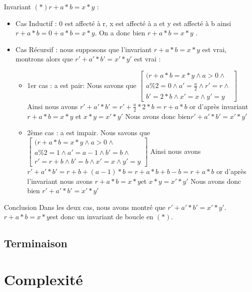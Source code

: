 \documentclass[12pt,a4paper]{report}
\begin{document}
\begin{flushleft}
Invariant $(*) r+a*b = x*y$ :\\
\begin{itemize}
\item Cas Inductif : 0   est affecté à r, x  est affecté à a  et y   est affecté à b  ainsi $ r +a*b = 0 + a*b = x*y $. On a donc bien $ r + a*b = x*y$ .
\item Cas Récursif : nous supposons que l’invariant  $ r + a*b = x*y$ est vrai, montrons alors que  $ r' + a'*b' = x'*y'$ est vrai :
\begin{itemize}
\item 1er cas : a est pair:  Nous savons que $\left[ \begin{array}{c}(r + a*b = x*y\wedge a>0\wedge \\
a\%2=0\wedge a'= \frac{a}{2} \wedge r'=r \wedge\\
b'=2*b\wedge x'=x \wedge y'=y\end{array}
\right]$  Ainsi nous avons $ r' + a'*b' = r' + \frac{a}{2} * 2 * b  = r+ a*b$ or d’après
 invariant $ r+a*b = x*y $ et  $ x*y = x'*y'$ Nous avons donc bien\medskip $ r'+a'*b' = x'*y'$
\item 2ème cas : a est impair. Nous savons que $\left[ \begin{array}{c}(r + a*b = x*y\wedge a>0\wedge \\
a\%2=1\wedge a'= a-1\wedge b'=b \wedge\\
r'=r+b\wedge b'=b\wedge x'=x \wedge y'=y\end{array}
\right]$ Ainsi nous avons $r'+ a'*b'=r+b+(a-1)*b = r+a*b + b-b = r+a*b  $ or d’après l’invariant nous avons  $ r+a*b = x*y $et $ x*y = x'*y' $ Nous avons donc bien $ r'+a'*b' = x'*y'$
\end{itemize}
\end{itemize}
\begin{Cas1}{Conclusion}
 Dans les deux cas, nous avons montré que $ r'+a'*b'= x'*y' $.
$ r+a*b=x*y $est donc un invariant de boucle en $(*) $.
\end{Cas1}
\end{flushleft}

\section{Terminaison}


\chapter{Complexité}
\end{document}
